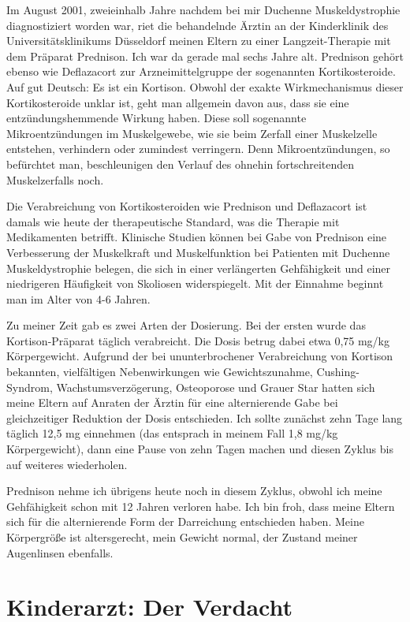 \documentclass[fontsize=14pt,a4paper,headinclude,DIV=calc,automark]{scrbook}
\begin{document}
Im August 2001, zweieinhalb Jahre nachdem bei mir Duchenne Muskeldystrophie diagnostiziert worden war, riet die behandelnde Ärztin an der Kinderklinik des Universitätsklinikums Düsseldorf meinen Eltern zu einer Langzeit-Therapie mit dem Präparat Prednison. Ich war da gerade mal sechs Jahre alt. Prednison gehört ebenso wie Deflazacort zur Arzneimittelgruppe der sogenannten Kortikosteroide. Auf gut Deutsch: Es ist ein Kortison. Obwohl der exakte Wirkmechanismus dieser Kortikosteroide unklar ist, geht man allgemein davon aus, dass sie eine entzündungshemmende Wirkung haben. Diese soll sogenannte Mikroentzündungen im Muskelgewebe, wie sie beim Zerfall einer Muskelzelle entstehen, verhindern oder zumindest verringern. Denn Mikroentzündungen, so befürchtet man, beschleunigen den Verlauf des ohnehin fortschreitenden Muskelzerfalls noch.

Die Verabreichung von Kortikosteroiden wie Prednison und Deflazacort ist damals wie heute der therapeutische Standard, was die Therapie mit Medikamenten betrifft. Klinische Studien können bei Gabe von Prednison eine Verbesserung der Muskelkraft und Muskelfunktion bei Patienten mit Duchenne Muskeldystrophie belegen, die sich in einer verlängerten Gehfähigkeit und einer niedrigeren Häufigkeit von Skoliosen widerspiegelt. Mit der Einnahme beginnt man im Alter von 4-6 Jahren.

Zu meiner Zeit gab es zwei Arten der Dosierung. Bei der ersten wurde das Kortison-Präparat täglich verabreicht. Die Dosis betrug dabei etwa 0,75 mg/kg Körpergewicht. Aufgrund der bei ununterbrochener Verabreichung von Kortison bekannten, vielfältigen Nebenwirkungen wie Gewichtszunahme, Cushing-Syndrom, Wachstumsverzögerung, Osteoporose und Grauer Star hatten sich meine Eltern auf Anraten der Ärztin für eine alternierende Gabe bei gleichzeitiger Reduktion der Dosis entschieden. Ich sollte zunächst zehn Tage lang täglich 12,5 mg einnehmen (das entsprach in meinem Fall 1,8 mg/kg Körpergewicht), dann eine Pause von zehn Tagen machen und diesen Zyklus bis auf weiteres wiederholen.

Prednison nehme ich übrigens heute noch in diesem Zyklus, obwohl ich meine Gehfähigkeit schon mit 12 Jahren verloren habe. Ich bin froh, dass meine Eltern sich für die alternierende Form der Darreichung entschieden haben. Meine Körpergröße ist altersgerecht, mein Gewicht normal, der Zustand meiner Augenlinsen ebenfalls.

\section{Kinderarzt: Der Verdacht}
\end{document}
